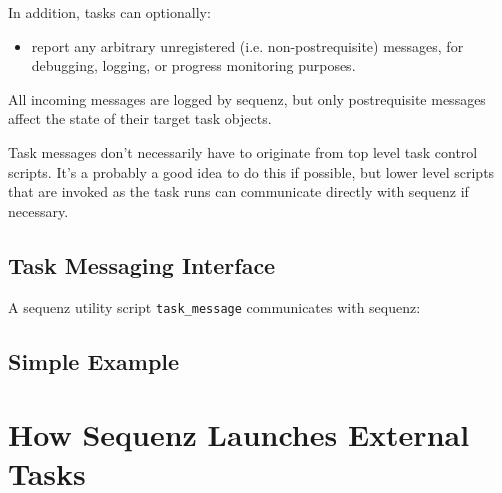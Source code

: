 \documentclass[11pt,a4paper]{article}
\begin{document}
In addition, tasks can optionally:

\begin{itemize}
\item report any arbitrary unregistered (i.e. non-postrequisite)
messages, for debugging, logging, or progress monitoring purposes.
\end{itemize}

All incoming messages are logged by sequenz, but only postrequisite
messages affect the state of their target task objects.

Task messages don't necessarily have to originate from top level task
control scripts. It's a probably a good idea to do this if possible, but
lower level scripts that are invoked as the task runs can communicate
directly with sequenz if necessary.

\subsection{Task Messaging Interface}

A sequenz utility script \verb=task_message= communicates with sequenz:


\subsection{Simple Example}

\section{How Sequenz Launches External Tasks}
\end{document}
